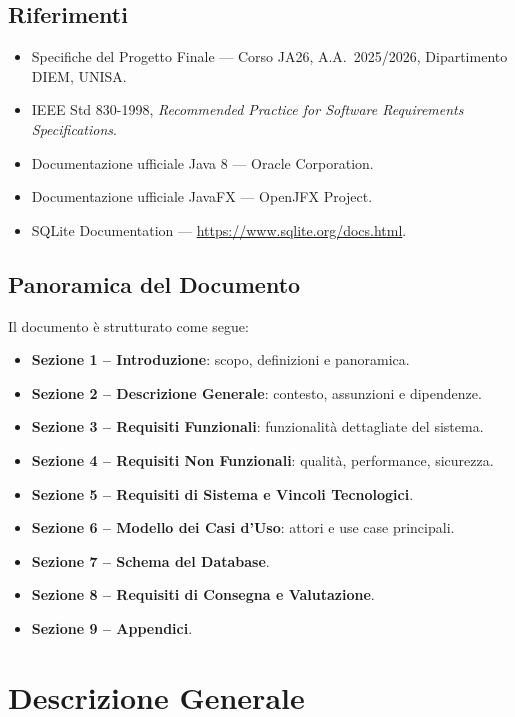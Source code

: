 \documentclass[12pt, a4paper]{article}
\begin{document}
\subsection{Riferimenti}

\begin{itemize}[leftmargin=*]
    \item Specifiche del Progetto Finale — Corso JA26, A.A.\ 2025/2026, Dipartimento DIEM, UNISA.
    \item IEEE Std 830-1998, \textit{Recommended Practice for Software Requirements Specifications}.
    \item Documentazione ufficiale Java 8 — Oracle Corporation.
    \item Documentazione ufficiale JavaFX — OpenJFX Project.
    \item SQLite Documentation — \url{https://www.sqlite.org/docs.html}.
\end{itemize}

\subsection{Panoramica del Documento}

Il documento è strutturato come segue:
\begin{itemize}[leftmargin=*]
    \item \textbf{Sezione 1 – Introduzione}: scopo, definizioni e panoramica.
    \item \textbf{Sezione 2 – Descrizione Generale}: contesto, assunzioni e dipendenze.
    \item \textbf{Sezione 3 – Requisiti Funzionali}: funzionalità dettagliate del sistema.
    \item \textbf{Sezione 4 – Requisiti Non Funzionali}: qualità, performance, sicurezza.
    \item \textbf{Sezione 5 – Requisiti di Sistema e Vincoli Tecnologici}.
    \item \textbf{Sezione 6 – Modello dei Casi d'Uso}: attori e use case principali.
    \item \textbf{Sezione 7 – Schema del Database}.
    \item \textbf{Sezione 8 – Requisiti di Consegna e Valutazione}.
    \item \textbf{Sezione 9 – Appendici}.
\end{itemize}

\newpage
\section{Descrizione Generale}
\end{document}
